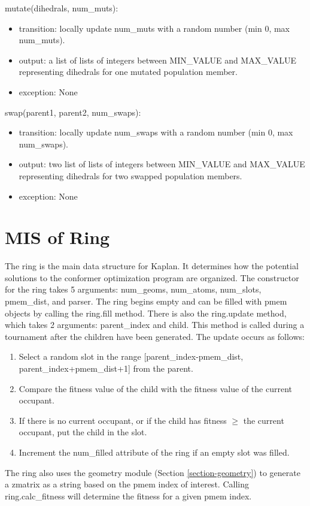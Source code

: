 \documentclass[12pt, titlepage]{article}
\newcommand{\progname}{Kaplan}
\begin{document}
\noindent mutate(dihedrals, num\_muts):
\begin{itemize}
	\item transition: locally update num\_muts with a random number (min 0, max 
	num\_muts).
	\item output: a list of lists of integers between MIN\_VALUE and 
	MAX\_VALUE representing dihedrals for one mutated population member.
	\item exception: None
\end{itemize}

\noindent swap(parent1, parent2, num\_swaps):
\begin{itemize}
	\item transition: locally update num\_swaps with a random number (min 0, 
	max num\_swaps).
	\item output: two list of lists of integers between MIN\_VALUE and 
	MAX\_VALUE representing dihedrals for two swapped population members.
	\item exception: None
\end{itemize}

\section{MIS of Ring} \label{section-ring}

The ring is the main data structure for \progname{}. It determines how the 
potential solutions to the conformer optimization program are organized. The 
constructor for the ring takes 5 arguments: num\_geoms, num\_atoms, num\_slots, 
pmem\_dist, and parser. The ring begins empty and can be filled with pmem 
objects by calling the ring.fill method. There is also the ring.update method, 
which takes 2 arguments: parent\_index and child. This method is called during 
a tournament after the children have been generated. The update occurs as 
follows:
\begin{enumerate}
	\item Select a random slot in the range [parent\_index-pmem\_dist, 
	parent\_index+pmem\_dist+1] from 
	the parent.
	\item Compare the fitness value of the child with the fitness value of the 
	current occupant.
	\item If there is no current occupant, or if the child has fitness $\geq$ 
	the current occupant, put the child in the slot.
	\item Increment the num\_filled attribute of the ring if an empty slot was 
	filled.
\end{enumerate}
The ring also uses the geometry module (Section \ref{section-geometry}) to 
generate a zmatrix as a string based on the pmem index of interest. Calling 
ring.calc\_fitness will determine the fitness for a given pmem index.
\end{document}

